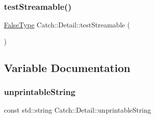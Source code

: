\mbox{\label{namespace_catch_1_1_detail_aac81f01b0d687f75b8f24a925591b7ac}} 
\subsubsection{\texorpdfstring{test\+Streamable()}{testStreamable()}\hspace{0.1cm}{\footnotesize\ttfamily [2/2]}}
{\footnotesize\ttfamily \mbox{\hyperlink{struct_catch_1_1_detail_1_1_false_type}{False\+Type}} Catch\+::\+Detail\+::test\+Streamable (\begin{DoxyParamCaption}\item[{\mbox{\hyperlink{struct_catch_1_1_detail_1_1_false_type}{False\+Type}}}]{ }\end{DoxyParamCaption})}



\subsection{Variable Documentation}
\mbox{\label{namespace_catch_1_1_detail_a466775f4eec29ffef29ab334cd885136}} 
\subsubsection{\texorpdfstring{unprintable\+String}{unprintableString}}
{\footnotesize\ttfamily const std\+::string Catch\+::\+Detail\+::unprintable\+String}

